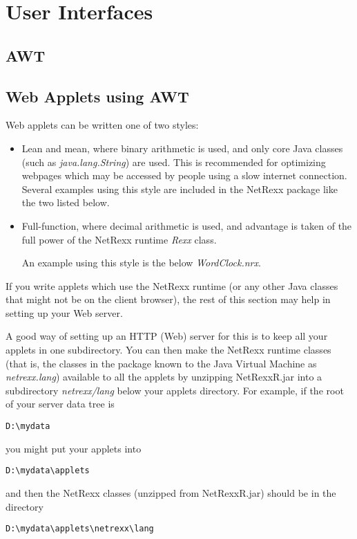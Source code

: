 \chapter{User Interfaces}
\section{AWT}

\section{Web Applets using AWT}

Web applets can be written one of two styles:
\begin{itemize}
\item Lean and mean, where binary arithmetic is used, and only core
Java classes (such as \emph{java.lang.String}) are used.  This is
recommended for optimizing webpages which may be accessed by people
using a slow internet connection.
Several examples using this style are included in the NetRexx package
like the two listed below.



\item Full-function, where decimal arithmetic is used, and advantage is
taken of the full power of the NetRexx runtime \emph{Rexx} class.

An example using this style is the below
\emph{WordClock.nrx}.

\end{itemize}
If you write applets which use the NetRexx runtime (or any other Java
classes that might not be on the client browser), the rest of this
section may help in setting up your Web server.

A good way of setting up an HTTP (Web) server for this is to keep all
your applets in one subdirectory.  You can then make the NetRexx runtime
classes (that is, the classes in the package known to the Java Virtual
Machine as \emph{netrexx.lang}) available to all the applets by
unzipping NetRexxR.jar into a subdirectory \emph{netrexx/lang} below
your applets directory.
\newline
For example, if the root of your server data tree is
\begin{verbatim}
D:\mydata
\end{verbatim}
 you might put your applets into
\begin{verbatim}
D:\mydata\applets
\end{verbatim}
and then the NetRexx classes (unzipped from NetRexxR.jar) should be in
the directory
\begin{verbatim}
D:\mydata\applets\netrexx\lang
\end{verbatim}

